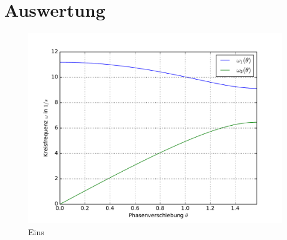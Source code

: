 \section{Auswertung}

\begin{figure}
  \centering
  \includegraphics[width = \textwidth]{../Messdaten/plots/dispersion1.pdf}
  \caption{Eins \cite{anleitung356}}
  \label{fig: }
\end{figure}
